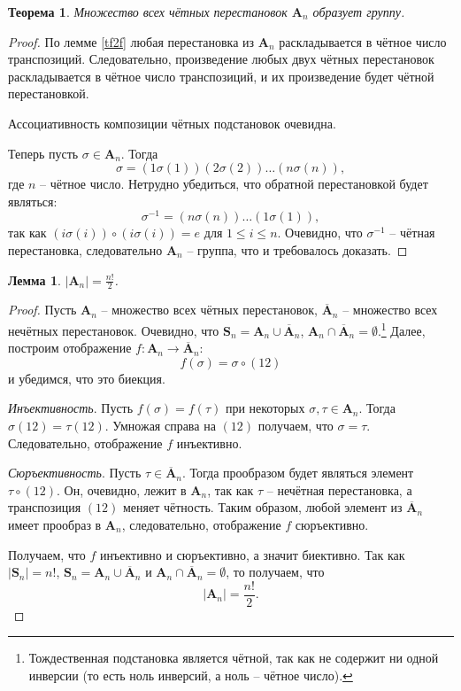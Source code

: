 \documentclass{article}
\newtheorem{lemma}{Лемма}[section]
\newtheorem{theorem}{Теорема}[section]
\begin{document}
\begin{theorem} \label{rejifsd}
    Множество всех чётных перестановок $\textbf{A}_n$ образует группу.
\end{theorem}
\begin{proof}
    По лемме \ref{tf2f} любая перестановка из $\textbf{A}_n$ раскладывается в чётное число транспозиций. Следовательно, произведение любых двух чётных перестановок раскладывается в чётное число транспозиций, и их произведение будет чётной перестановкой.

    Ассоциативность композиции чётных подстановок очевидна.

    Теперь пусть $\sigma \in \textbf{A}_n$. Тогда $$\sigma = (1\sigma(1)) (2\sigma(2)) \dots (n\sigma(n)),$$ где $n$ -- чётное число. Нетрудно убедиться, что обратной перестановкой будет являться: $$ \sigma^{-1} = (n\sigma(n)) \dots (1\sigma(1)), $$ так как $(i\sigma(i)) \circ (i \sigma(i)) = e$ для $1 \leqslant i \leqslant n$. Очевидно, что $\sigma^{-1}$ -- чётная перестановка, следовательно $\textbf{A}_n$ -- группа, что и требовалось доказать.
\end{proof}

\begin{lemma}
    $|\textbf{A}_n| = \frac{n!}{2}$.
\end{lemma}
\begin{proof}
    Пусть $\textbf{A}_n$ -- множество всех чётных перестановок, $\overline{\textbf{A}}_n$ -- множество всех нечётных перестановок. Очевидно, что $\textbf{S}_n = \textbf{A}_n \cup \overline{\textbf{A}}_n $, $\textbf{A}_n \cap \overline{\textbf{A}}_n = \emptyset$.\footnote{Тождественная подстановка является чётной, так как не содержит ни одной инверсии (то есть ноль инверсий, а ноль -- чётное число).} Далее, построим отображение $f: \textbf{A}_n \rightarrow \overline{\textbf{A}}_n $: $$ f(\sigma) = \sigma \circ (12) $$ и убедимся, что это биекция.

    \textit{Инъективность}. Пусть $f(\sigma) = f(\tau)$ при некоторых $\sigma, \tau \in \textbf{A}_n$. Тогда $ \sigma (12) = \tau (12) $. Умножая справа на $(12)$ получаем, что $\sigma = \tau$. Следовательно, отображение $f$ инъективно.

    \textit{Сюръективность}. Пусть $\tau \in \overline{\textbf{A}}_n$. Тогда прообразом будет являться элемент $ \tau \circ (12) $. Он, очевидно, лежит в $\textbf{A}_n$, так как $\tau$ -- нечётная перестановка, а транспозиция $(12)$ меняет чётность. Таким образом, любой элемент из $\overline{\textbf{A}}_n$ имеет прообраз в $\textbf{A}_n$, следовательно, отображение $f$ сюръективно.

    Получаем, что $f$ инъективно и сюръективно, а значит биективно. Так как $|\textbf{S}_n| = n!$, $\textbf{S}_n = \textbf{A}_n \cup \overline{\textbf{A}}_n $ и $\textbf{A}_n \cap \overline{\textbf{A}}_n = \emptyset$, то получаем, что $$|\textbf{A}_n| = \frac{n!}{2}.$$
\end{proof}
\end{document}
